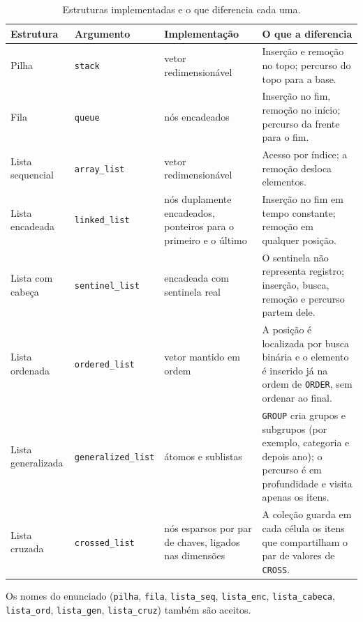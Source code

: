 \documentclass[11pt,a4paper]{article}
\newcommand{\cab}[1]{\rowcolor{gray!22}#1}
\begin{document}
\begin{table}[!htbp]
\centering
\caption{Estruturas implementadas e o que diferencia cada uma.}
\footnotesize
\begin{tabularx}{\textwidth}{@{}l l Y Y@{}}
\toprule
\cab{\textbf{Estrutura} & \textbf{Argumento} & \textbf{Implementação} & \textbf{O que a diferencia}} \\
\midrule
Pilha & \texttt{stack} & vetor redimensionável & Inserção e remoção no topo; percurso do topo para a base. \\
Fila & \texttt{queue} & nós encadeados & Inserção no fim, remoção no início; percurso da frente para o fim. \\
Lista sequencial & \texttt{array\_\allowbreak{}list} & vetor redimensionável & Acesso por índice; a remoção desloca elementos. \\
Lista encadeada & \texttt{linked\_\allowbreak{}list} & nós duplamente encadeados, ponteiros para o primeiro e o último & Inserção no fim em tempo constante; remoção em qualquer posição. \\
Lista com cabeça & \texttt{sentinel\_\allowbreak{}list} & encadeada com sentinela real & O sentinela não representa registro; inserção, busca, remoção e percurso partem dele. \\
Lista ordenada & \texttt{ordered\_\allowbreak{}list} & vetor mantido em ordem & A posição é localizada por busca binária e o elemento é inserido já na ordem de \texttt{ORDER}, sem ordenar ao final. \\
Lista generalizada & \texttt{generalized\_\allowbreak{}list} & átomos e sublistas & \texttt{GROUP} cria grupos e subgrupos (por exemplo, categoria e depois ano); o percurso é em profundidade e visita apenas os itens. \\
Lista cruzada & \texttt{crossed\_\allowbreak{}list} & nós esparsos por par de chaves, ligados nas dimensões & A coleção guarda em cada célula os itens que compartilham o par de valores de \texttt{CROSS}. \\
\bottomrule
\end{tabularx}
\end{table}

Os nomes do enunciado (\texttt{pilha}, \texttt{fila}, \texttt{lista\_\allowbreak{}seq}, \texttt{lista\_\allowbreak{}enc}, \texttt{lista\_\allowbreak{}cabeca}, \texttt{lista\_\allowbreak{}ord}, \texttt{lista\_\allowbreak{}gen}, \texttt{lista\_\allowbreak{}cruz}) também são aceitos.

\end{document}
